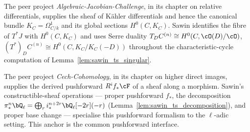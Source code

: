 \begin{definition}
  \label{def:peer_canonical_differentials}
  The peer project \emph{Algebraic-Jacobian-Challenge}, in its chapter on
  relative differentials, supplies the sheaf of Kähler differentials and hence
  the canonical bundle $K_C = \Omega^1_{C/k}$ and its global sections
  $H^0(C,K_C)$.  Sawin identifies the fibre of $T^*J$ with $H^0(C,K_C)$ and uses
  Serre duality $T_{D}C^{(n)} \cong H^0(C,\cO(D)/\cO)$,
  $(T^*)_{D}C^{(n)} \cong H^0(C, K_C/K_C(-D))$ throughout the
  characteristic-cycle computation of Lemma~\ref{lem:sawin_ts_singular}.
\end{definition}

\begin{definition}
  \label{def:peer_higher_direct_image}
  The peer project \emph{Cech-Cohomology}, in its chapter on higher direct
  images, supplies the derived pushforward $R^i f_* \cF$ of a sheaf along a
  morphism.  Sawin's constructible-sheaf operations --- proper pushforward
  $f_*$, the decomposition $\pi^n_*\bQ_\ell = \bigoplus_r i^{n+2r}_*
  \bQ_\ell[-2r](-r)$ (Lemma~\ref{lem:sawin_ts_decomposition}), and proper base
  change --- specialise this pushforward formalism to the $\ell$-adic setting.
  This anchor is the common pushforward interface.
\end{definition}
